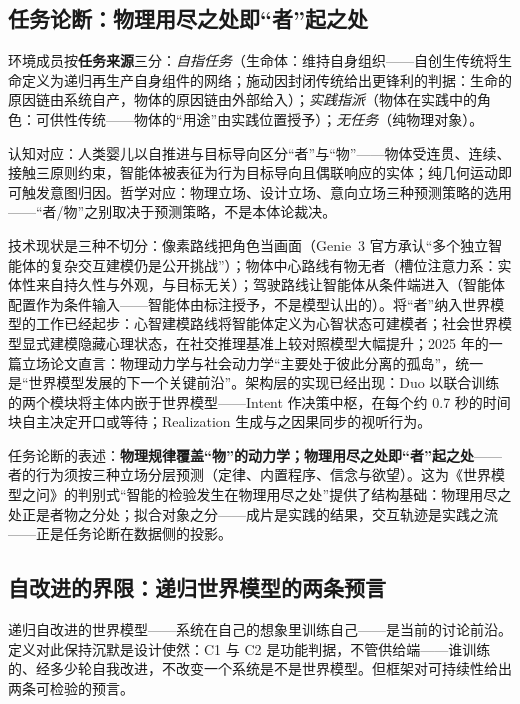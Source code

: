 \documentclass[10pt,fontset=fandol]{ctexart}
\begin{document}
\subsection{任务论断：物理用尽之处即“者”起之处}\label{sec:task}

环境成员按\textbf{任务来源}三分：\emph{自指任务}（生命体：维持自身组织——自创生传统将生命定义为递归再生产自身组件的网络\cite{varela1974}；施动因封闭传统给出更锋利的判据：生命的原因链由系统自产，物体的原因链由外部给入\cite{rosen1991}）；\emph{实践指派}（物体在实践中的角色：可供性传统——物体的“用途”由实践位置授予）；\emph{无任务}（纯物理对象）。

认知对应：人类婴儿以自推进与目标导向区分“者”与“物”——物体受连贯、连续、接触三原则约束，智能体被表征为行为目标导向且偶联响应的实体\cite{spelke2007core}；纯几何运动即可触发意图归因\cite{heider1944}。哲学对应：物理立场、设计立场、意向立场三种预测策略的选用\cite{dennett1987}——“者/物”之别取决于预测策略，不是本体论裁决。

技术现状是三种不切分：像素路线把角色当画面（Genie~3 官方承认“多个独立智能体的复杂交互建模仍是公开挑战”\cite{deepmind2025genie3}）；物体中心路线有物无者（槽位注意力系：实体性来自持久性与外观，与目标无关\cite{locatello2020slot}）；驾驶路线让智能体从条件端进入（智能体配置作为条件输入\cite{wayve2025gaia2}——智能体由标注授予，不是模型认出的）。将“者”纳入世界模型的工作已经起步：心智建模路线将智能体定义为心智状态可建模者\cite{rabinowitz2018tom}；社会世界模型显式建模隐藏心理状态，在社交推理基准上较对照模型大幅提升\cite{liu2025swm}；2025 年的一篇立场论文直言：物理动力学与社会动力学“主要处于彼此分离的孤岛”，统一是“世界模型发展的下一个关键前沿”\cite{zhang2025unification}。架构层的实现已经出现：Duo 以联合训练的两个模块将主体内嵌于世界模型——Intent 作决策中枢，在每个约 0.7 秒的时间块自主决定开口或等待；Realization 生成与之因果同步的视听行为\cite{duo2026}。

任务论断的表述：\textbf{物理规律覆盖“物”的动力学；物理用尽之处即“者”起之处}——者的行为须按三种立场分层预测（定律、内置程序、信念与欲望）。这为《世界模型之问》\cite{yu2026worldmodelq}的判别式“智能的检验发生在物理用尽之处”提供了结构基础：物理用尽之处正是者物之分处；拟合对象之分——成片是实践的结果，交互轨迹是实践之流——正是任务论断在数据侧的投影。

\subsection{自改进的界限：递归世界模型的两条预言}\label{sec:selfimprove}

递归自改进的世界模型——系统在自己的想象里训练自己——是当前的讨论前沿。定义对此保持沉默是设计使然：C1 与 C2 是功能判据，不管供给端——谁训练的、经多少轮自我改进，不改变一个系统是不是世界模型。但框架对可持续性给出两条可检验的预言。
\end{document}
